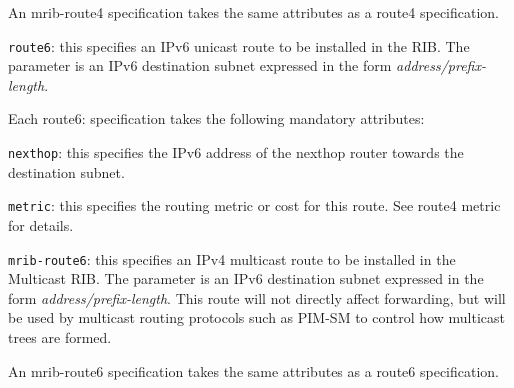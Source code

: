 \begin{description}
  An {\stt mrib-route4} specification takes the same attributes as a
  {\stt route4} specification.
\item{\tt route6}: this specifies an IPv6 unicast route to be
  installed in the RIB.  The parameter is an IPv6 destination subnet
  expressed in the form {\it address/prefix-length}.

  Each {\stt route6}: specification takes the following mandatory
  attributes:
\begin{description}
\item{\tt nexthop}: this specifies the IPv6 address of the nexthop
  router towards the destination subnet.
\item{\tt metric}: this specifies the routing metric or cost for this
  route.  See {\stt route4 metric} for details.
\end{description}
\item{\tt mrib-route6}: this specifies an IPv4 multicast route to be
  installed in the Multicast RIB.  The parameter is an IPv6
  destination subnet expressed in the form {\it
  address/prefix-length}.  This route will not directly affect
  forwarding, but will be used by multicast routing protocols such as
  PIM-SM to control how multicast trees are formed.

  An {\stt mrib-route6} specification takes the same attributes as a
  {\stt route6} specification.
\end{description}

\newpage
